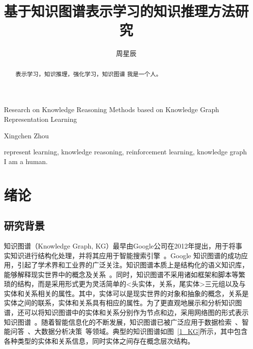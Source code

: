 \documentclass[algorithmlist, AutoFakeBold, AutoFakeSlant, figurelist, tablelist, nomlist, masters]{seuthesix}
\begin{document}
\captionsetup{labelformat=default, labelsep=space}

% 
\setcounter{secnumdepth}{4}
\setcounter{tocdepth}{4}
\newtheorem{definition}{定义}[chapter]
\newcommand{\tabincell}[2]{\begin{tabular}{@{}#1@{}}#2\end{tabular}}  

\title{基于知识图谱表示学习的知识推理方法研究}{}{Research on Knowledge Reasoning Methods based on Knowledge Graph Representation Learning}{}
\author{周星辰}{Xingchen Zhou}
\submajor{}
\authorizedate{\ }
\committeechair{}
\reviewer{}{}
\makebigcover
\makecover

\begin{abstract}{表示学习，知识推理，强化学习，知识图谱}
我是一个人。
\end{abstract}

\begin{englishabstract}{represent learning, knowledge reasoning, reinforcement learning, knowledge graph}
I am a human.
\end{englishabstract} 

\tableofcontents
\mainmatter  %

\chapter{绪论}
\section{研究背景}
知识图谱（Knowledge Graph, KG）最早由Google公司在2012年提出，用于将事实知识进行结构化处理，并将其应用于智能搜索引擎~\cite{singhal_2012}。Google 知识图谱的成功应用，引起了学术界和工业界的广泛关注。知识图谱本质上是结构化的语义知识库，能够解释现实世界中的概念及关系~\cite{nickel2015review}。同时，知识图谱不采用诸如框架和脚本等繁琐的结构，而是采用形式更为灵活简单的<头实体，关系，尾实体>三元组以及与实体和关系相关的属性。其中，实体可以是现实世界的对象和抽象的概念，关系是实体之间的联系，实体和关系具有相应的属性。为了更直观地展示和分析知识图谱，还可以将知识图谱中的实体和关系分别作为节点和边，采用网络图的形式表示知识图谱~\cite{noy2019industry}。随着智能信息化的不断发展，知识图谱已被广泛应用于数据检索~\cite{rinaldi2021semantic,sarhan2021open,li2021research}、智能问答~\cite{li2021improving,do2021developing}、大数据分析决策~\cite{zhou2021geoscience,abu2021relational}等领域。典型的知识图谱如图~\ref{1_KG}所示，其中包含各种类型的实体和关系信息，同时实体之间存在概念层次结构。
\end{document}
